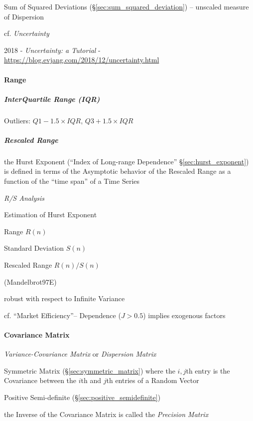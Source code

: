\fist Sum of Squared Deviations (\S\ref{sec:sum_squared_deviation}) -- unscaled
measure of Dispersion

cf. \emph{Uncertainty}

2018 - \emph{Uncertainty: a Tutorial} -
\url{https://blog.evjang.com/2018/12/uncertainty.html}



\paragraph{Range}\label{sec:range}\hfill

\subparagraph{InterQuartile Range (IQR)}\label{sec:iqr}\hfill

Outliers:  $Q1 - 1.5 \times IQR$, $Q3 + 1.5 \times IQR$



\subparagraph{Rescaled Range}\label{sec:rescaled_range}\hfill

\fist the Hurst Exponent (``Index of Long-range Dependence''
\S\ref{sec:hurst_exponent}) is defined in terms of the Asymptotic behavior of
the Rescaled Range as a function of the ``time span'' of a Time Series

\emph{R/S Analysis}

Estimation of Hurst Exponent

Range $R(n)$

Standard Deviation $S(n)$

Rescaled Range $R(n) / S(n)$

(Mandelbrot97E)

robust with respect to Infinite Variance

cf. ``Market Efficiency''-- Dependence ($J > 0.5$) implies exogenous factors



\paragraph{Covariance Matrix}\label{sec:covariance_matrix}\hfill

\emph{Variance-Covariance Matrix} or \emph{Dispersion Matrix}

Symmetric Matrix (\S\ref{sec:symmetric_matrix}) where the $i,j$th entry is the
Covariance between the $i$th and $j$th entries of a Random Vector

Positive Semi-definite (\S\ref{sec:positive_semidefinite})

the Inverse of the Covariance Matrix is called the \emph{Precision Matrix}



